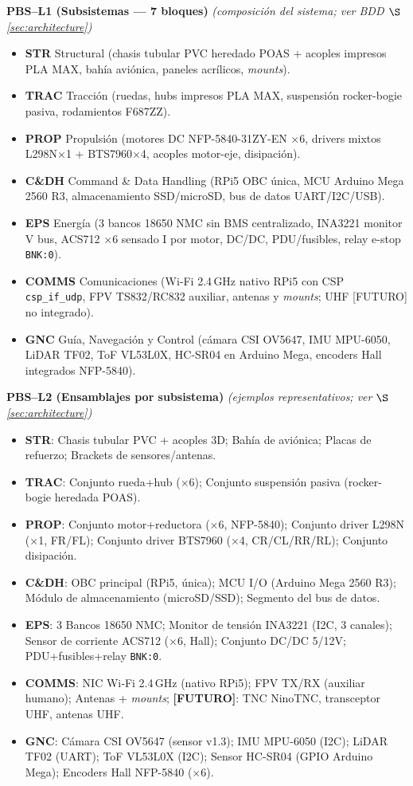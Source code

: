 \noindent\textbf{PBS--L1 (Subsistemas --- 7 bloques)} \emph{(composición del sistema; ver BDD $\S$\ref{sec:architecture})} \cite{nasa_cm}
\begin{itemize}
  \item \textbf{STR} Structural (chasis tubular PVC heredado POAS + acoples impresos PLA MAX, bahía aviónica, paneles acrílicos, \emph{mounts}).
  \item \textbf{TRAC} Tracción (ruedas, hubs impresos PLA MAX, suspensión rocker-bogie pasiva, rodamientos F687ZZ).
  \item \textbf{PROP} Propulsión (motores DC NFP-5840-31ZY-EN ×6, drivers mixtos L298N×1 + BTS7960×4, acoples motor-eje, disipación).
  \item \textbf{C\&DH} Command \& Data Handling (RPi5 OBC única, MCU Arduino Mega 2560 R3, almacenamiento SSD/microSD, bus de datos UART/I2C/USB).
  \item \textbf{EPS} Energía (3 bancos 18650 NMC sin BMS centralizado, INA3221 monitor V bus, ACS712 ×6 sensado I por motor, DC/DC, PDU/fusibles, relay e-stop \texttt{BNK:0}).
  \item \textbf{COMMS} Comunicaciones (Wi‑Fi 2.4\,GHz nativo RPi5 con CSP \texttt{csp\_if\_udp}, FPV TS832/RC832 auxiliar, antenas y \emph{mounts}; UHF [FUTURO] no integrado).
  \item \textbf{GNC} Guía, Navegación y Control (cámara CSI OV5647, IMU MPU-6050, LiDAR TF02, ToF VL53L0X, HC-SR04 en Arduino Mega, encoders Hall integrados NFP-5840).
\end{itemize}

\noindent\textbf{PBS--L2 (Ensamblajes por subsistema)} \emph{(ejemplos representativos; ver $\S$\ref{sec:architecture})} \cite{nasa_cm}
\begin{itemize}
  \item \textbf{STR}: Chasis tubular PVC + acoples 3D; Bahía de aviónica; Placas de refuerzo; Brackets de sensores/antenas.
  \item \textbf{TRAC}: Conjunto rueda+hub ($\times$6); Conjunto suspensión pasiva (rocker-bogie heredada POAS).
  \item \textbf{PROP}: Conjunto motor+reductora ($\times$6, NFP-5840); Conjunto driver L298N (×1, FR/FL); Conjunto driver BTS7960 (×4, CR/CL/RR/RL); Conjunto disipación.
  \item \textbf{C\&DH}: OBC principal (RPi5, única); MCU I/O (Arduino Mega 2560 R3); Módulo de almacenamiento (microSD/SSD); Segmento del bus de datos.
  \item \textbf{EPS}: 3 Bancos 18650 NMC; Monitor de tensión INA3221 (I2C, 3 canales); Sensor de corriente ACS712 (×6, Hall); Conjunto DC/DC 5/12V; PDU+fusibles+relay \texttt{BNK:0}.
  \item \textbf{COMMS}: NIC Wi‑Fi 2.4\,GHz (nativo RPi5); FPV TX/RX (auxiliar humano); Antenas + \emph{mounts}; \textbf{[FUTURO]}: TNC NinoTNC, transceptor UHF, antenas UHF.
  \item \textbf{GNC}: Cámara CSI OV5647 (sensor v1.3); IMU MPU-6050 (I2C); LiDAR TF02 (UART); ToF VL53L0X (I2C); Sensor HC-SR04 (GPIO Arduino Mega); Encoders Hall NFP-5840 ($\times$6).
\end{itemize}

